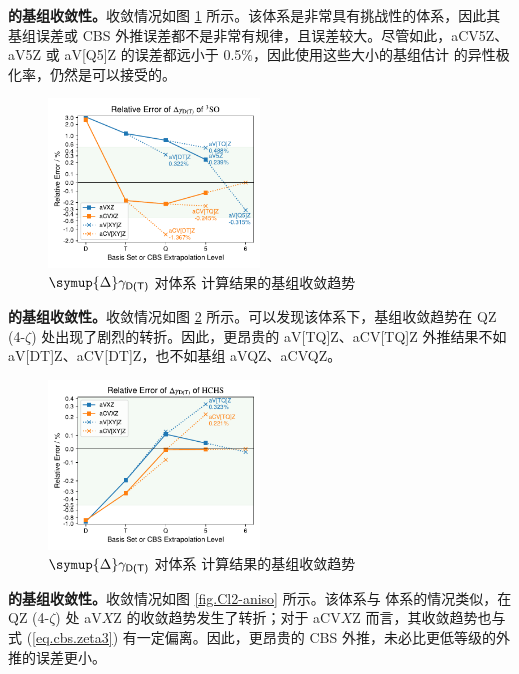 \textbf{ 的基组收敛性。}收敛情况如图 \ref{fig.SO-aniso} 所示。该体系是非常具有挑战性的体系，因此其基组误差或 CBS 外推误差都不是非常有规律，且误差较大。尽管如此，aCV5Z、aV5Z 或 aV[Q5]Z 的误差都远小于 0.5\%，因此使用这些大小的基组估计  的异性极化率，仍然是可以接受的。

\begin{figure}[ht]
    \centering
    \includegraphics[width=0.5\textwidth]{assets/SO-aniso.pdf}
    \caption{$\symup{\Delta} \gamma_\textsf{D(T)}$ 对体系  计算结果的基组收敛趋势}
    \label{fig.SO-aniso}
\end{figure}

\textbf{ 的基组收敛性。}收敛情况如图 \ref{fig.HCHS-aniso} 所示。可以发现该体系下，基组收敛趋势在 QZ (4-$\zeta$) 处出现了剧烈的转折。因此，更昂贵的 aV[TQ]Z、aCV[TQ]Z 外推结果不如 aV[DT]Z、aCV[DT]Z，也不如基组 aVQZ、aCVQZ。

\begin{figure}[ht]
    \centering
    \includegraphics[width=0.5\textwidth]{assets/HCHS-aniso.pdf}
    \caption{$\symup{\Delta} \gamma_\textsf{D(T)}$ 对体系  计算结果的基组收敛趋势}
    \label{fig.HCHS-aniso}
\end{figure}

\textbf{ 的基组收敛性。}收敛情况如图 \ref{fig.Cl2-aniso} 所示。该体系与  体系的情况类似，在 QZ (4-$\zeta$) 处 aV$X$Z 的收敛趋势发生了转折；对于 aCV$X$Z 而言，其收敛趋势也与式 (\ref{eq.cbs.zeta3}) 有一定偏离。因此，更昂贵的 CBS 外推，未必比更低等级的外推的误差更小。

